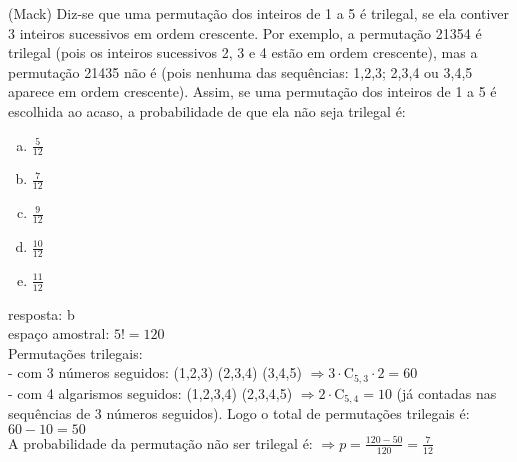\begin{ex}
  (Mack) Diz-se que uma permutação dos inteiros de 1 a 5 é trilegal, se ela contiver 3 inteiros sucessivos em ordem crescente. Por exemplo, a permutação 21354 é trilegal (pois os inteiros sucessivos 2, 3 e 4 estão em ordem crescente), mas a permutação 21435 não é (pois nenhuma das sequências: 1,2,3; 2,3,4 ou 3,4,5 aparece em ordem crescente). Assim, se uma permutação dos inteiros de 1 a 5 é escolhida ao acaso, a probabilidade de que ela não seja trilegal é:
    \begin{enumerate}  [(a)]
        \item $\frac{5}{12}$
        \item $\frac{7}{12}$
        \item $\frac{9}{12}$
        \item $\frac{10}{12}$
        \item $\frac{11}{12}$
    \end{enumerate}
      \begin{sol}
       resposta: b \\
       espaço amostral: $5!=120$ \\
       Permutações trilegais: \\
       - com 3 números seguidos: (1,2,3) (2,3,4) (3,4,5)  $\Rightarrow 3\cdot\mathrm{C}_{5,3}\cdot2=60$ \\
       - com 4 algarismos seguidos: (1,2,3,4) (2,3,4,5)    $\Rightarrow 2\cdot\mathrm{C}_{5,4}=10$ (já contadas nas sequências de 3 números seguidos). Logo o total de permutações trilegais é: $60-10=50$ \\
       A probabilidade da permutação não ser trilegal é:\hspace{0,3cm}
       $\Longrightarrow p=\frac{120-50}{120}=\frac{7}{12}$
      \end{sol}
 \end{ex}